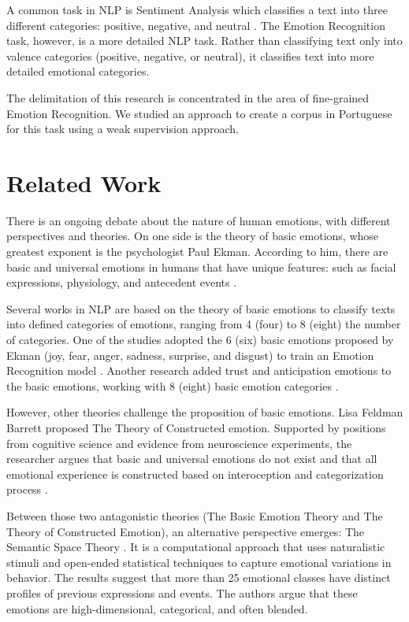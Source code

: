 \documentclass[12pt]{article}
\begin{document}
A common task in NLP is Sentiment Analysis which classifies a text into three different categories: positive, negative, and neutral \cite{Drus2019}. The Emotion Recognition task, however, is a more detailed NLP task. Rather than classifying text only into valence categories (positive, negative, or neutral), it classifies text into more detailed emotional categories.

The delimitation of this research is concentrated in the area of fine-grained Emotion Recognition. We studied an approach to create a corpus in Portuguese for this task using a weak supervision approach.

\section{Related Work}
\label{sec:related-work}

There is an ongoing debate about the nature of human emotions, with different perspectives and theories. On one side is the theory of basic emotions, whose greatest exponent is the psychologist Paul Ekman. According to him, there are basic and universal emotions in humans that have unique features: such as facial expressions, physiology, and antecedent events \cite{Ekman1992}.

Several works in NLP are based on the theory of basic emotions to classify texts into defined categories of emotions, ranging from 4 (four) to 8 (eight) the number of categories. One of the studies adopted the 6 (six) basic emotions proposed by Ekman (joy, fear, anger, sadness, surprise, and disgust) to train an Emotion Recognition model \cite{Batbaatar2019}. Another research added trust and anticipation emotions to the basic emotions, working with 8 (eight) basic emotion categories \cite{Sosea2020}.

However, other theories challenge the proposition of basic emotions. Lisa Feldman Barrett proposed The Theory of Constructed emotion. Supported by positions from cognitive science and evidence from neuroscience experiments, the researcher argues that basic and universal emotions do not exist and that all emotional experience is constructed based on interoception and categorization process \cite{Barrett2016}.

Between those two antagonistic theories (The Basic Emotion Theory and The Theory of Constructed Emotion), an alternative perspective emerges: The Semantic Space Theory \cite{Cowen2021}. It is a computational approach that uses naturalistic stimuli and open-ended statistical techniques to capture emotional variations in behavior. The results suggest that more than 25 emotional classes have distinct profiles of previous expressions and events. The authors argue that these emotions are high-dimensional, categorical, and often blended.
\end{document}
